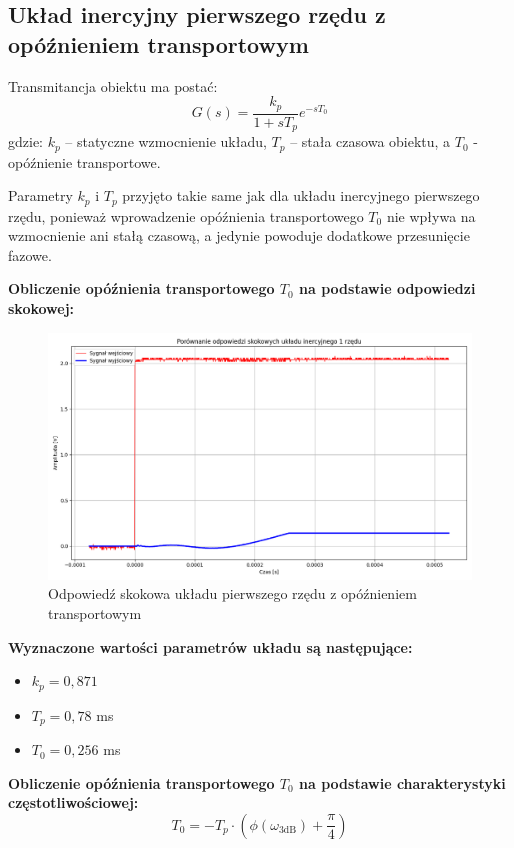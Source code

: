 \documentclass[12pt,a4paper]{article}
\begin{document}
	\subsection{Układ inercyjny pierwszego rzędu z opóźnieniem transportowym}
	Transmitancja obiektu ma postać:
	\begin{equation}
		G(s) = \frac{k_p}{1 + sT_p} e^{-sT_0}
	\end{equation}
	gdzie: \(k_p\) – statyczne wzmocnienie układu, \(T_p\) – stała czasowa obiektu, a \(T_0\) - opóźnienie transportowe.
	
	Parametry $k_p$ i $T_p$ przyjęto takie same jak dla układu inercyjnego pierwszego rzędu, ponieważ wprowadzenie opóźnienia transportowego $T_0$ nie wpływa na wzmocnienie ani stałą czasową, a jedynie powoduje dodatkowe przesunięcie fazowe.
	
	\textbf{Obliczenie opóźnienia transportowego $T_0$ na podstawie odpowiedzi skokowej:}
	\begin{figure}[H]
		\centering
		\includegraphics[width=1\linewidth]{zdjecia/odp_skok_z_opz.png}
		\caption{Odpowiedź skokowa układu pierwszego rzędu z opóźnieniem transportowym}
		\label{fig:odp_skok_z_opz}
	\end{figure}
	
	\textbf{Wyznaczone wartości parametrów układu są następujące:}
	\begin{itemize}
		\item $k_p = 0{,}871$
		\item $T_p = 0{,}78$ ms
		\item $T_0 = 0{,}256$ ms
	\end{itemize}
	
	\textbf{Obliczenie opóźnienia transportowego $T_0$ na podstawie charakterystyki częstotliwościowej:}
	\begin{equation}
		T_0 = -T_p \cdot \left( \phi(\omega_{3\text{dB}}) + \frac{\pi}{4} \right)
	\end{equation}
	
\end{document}
